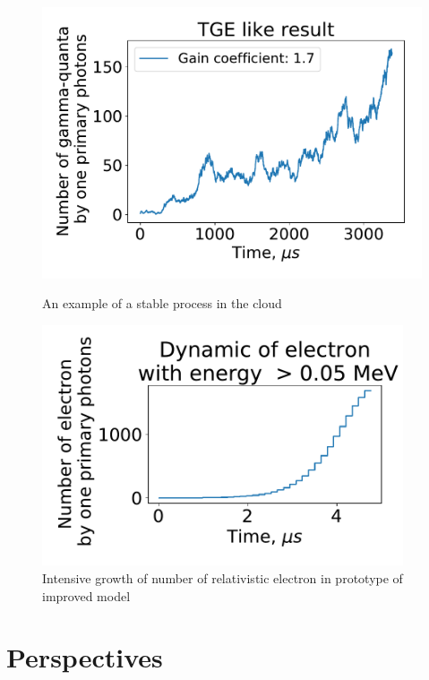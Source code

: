 \documentclass[%
 aip,
cp,  %
 amsmath,amssymb,%
 reprint,%
]{revtex4-2}
\begin{document}
\begin{figure}[ht!]
\begin{minipage}[t]{0.45\textwidth}
		\includegraphics[width=0.95\linewidth]{figures/proofTGE.pdf}
		\caption{
		An example of a stable process in the cloud
		}
		\label{pic-tge-a}
\end{minipage}\hfill%
\begin{minipage}[t]{0.45\textwidth}
		\includegraphics[width=0.95\textwidth]{figures/kotlinElectron.pdf}
		\caption{
		Intensive growth of  number of relativistic electron in prototype of improved model
		}
		\label{pic-electron-b}
\end{minipage}
\end{figure}

\section{Perspectives}
\end{document}
